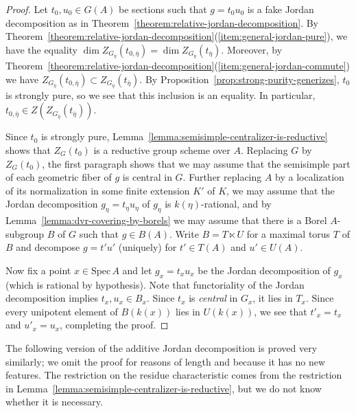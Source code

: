 \documentclass[11pt,reqno]{amsart}
\theoremstyle{definition}
\newcommand{\Spec}{\mathrm{Spec} \,}
\begin{document}
\begin{proof}
Let $t_0, u_0 \in G(A)$ be sections such that $g = t_0 u_0$ is a fake Jordan decomposition as in Theorem~\ref{theorem:relative-jordan-decomposition}. By Theorem~\ref{theorem:relative-jordan-decomposition}(\ref{item:general-jordan-pure}), we have the equality $\dim Z_{G_{\overline{\eta}}}(t_{0,\overline{\eta}}) = \dim Z_{G_{\overline{\eta}}}(t_{\overline{\eta}})$. Moreover, by Theorem~\ref{theorem:relative-jordan-decomposition}(\ref{item:general-jordan-commute}) we have $Z_{G_{\overline{\eta}}}(t_{0, \overline{\eta}}) \subset Z_{G_{\overline{\eta}}}(t_{\overline{\eta}})$. By Proposition~\ref{prop:strong-purity-generizes}, $t_0$ is strongly pure, so we see that this inclusion is an equality. In particular, $t_{0, \overline{\eta}} \in Z(Z_{G_{\overline{\eta}}}(t_{\overline{\eta}}))$. \smallskip

Since $t_0$ is strongly pure, Lemma~\ref{lemma:semisimple-centralizer-is-reductive} shows that $Z_G(t_0)$ is a reductive group scheme over $A$. Replacing $G$ by $Z_G(t_0)$, the first paragraph shows that we may assume that the semisimple part of each geometric fiber of $g$ is central in $G$. Further replacing $A$ by a localization of its normalization in some finite extension $K'$ of $K$, we may assume that the Jordan decomposition $g_\eta = t_\eta u_\eta$ of $g_\eta$ is $k(\eta)$-rational, and by Lemma~\ref{lemma:dvr-covering-by-borels} we may assume that there is a Borel $A$-subgroup $B$ of $G$ such that $g \in B(A)$. Write $B = T \ltimes U$ for a maximal torus $T$ of $B$ and decompose $g = t' u'$ (uniquely) for $t' \in T(A)$ and $u' \in U(A)$. \smallskip

Now fix a point $x \in \Spec A$ and let $g_x = t_x u_x$ be the Jordan decomposition of $g_x$ (which is rational by hypothesis). Note that functoriality of the Jordan decomposition implies $t_x, u_x \in B_x$. Since $t_x$ is \textit{central} in $G_x$, it lies in $T_x$. Since every unipotent element of $B(k(x))$ lies in $U(k(x))$, we see that $t'_x = t_x$ and $u'_x = u_x$, completing the proof.
\end{proof}

The following version of the additive Jordan decomposition is proved very similarly; we omit the proof for reasons of length and because it has no new features. The restriction on the residue characteristic comes from the restriction in Lemma~\ref{lemma:semisimple-centralizer-is-reductive}, but we do not know whether it is necessary.
\end{document}
